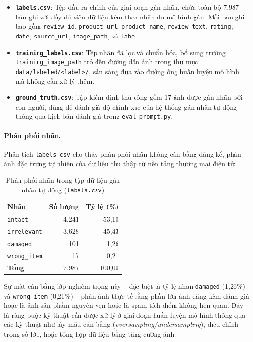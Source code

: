 \begin{itemize}
    \item \textbf{\texttt{labels.csv}}: Tệp đầu ra chính của giai đoạn gán nhãn, chứa
    toàn bộ 7.987 bản ghi với đầy đủ siêu dữ liệu kèm theo nhãn do mô hình gán. Mỗi
    bản ghi bao gồm \texttt{review\_id}, \texttt{product\_url}, \texttt{product\_name},
    \texttt{review\_text}, \texttt{rating}, \texttt{date}, \texttt{source\_url},
    \texttt{image\_path}, và \texttt{label}.

    \item \textbf{\texttt{training\_labels.csv}}: Tệp nhãn đã lọc và chuẩn hóa, bổ
    sung trường \texttt{training\_image\_path} trỏ đến đường dẫn ảnh trong thư mục
    \texttt{data/labeled/<label>/}, sẵn sàng đưa vào đường ống huấn luyện mô hình mà
    không cần xử lý thêm.

    \item \textbf{\texttt{ground\_truth.csv}}: Tập kiểm định thủ công gồm 17 ảnh được
    gán nhãn bởi con người, dùng để đánh giá độ chính xác của hệ thống gán nhãn tự
    động thông qua kịch bản đánh giá trong \texttt{eval\_prompt.py}.
\end{itemize}

\paragraph{Phân phối nhãn.}
Phân tích \texttt{labels.csv} cho thấy phân phối nhãn không cân bằng đáng kể, phản
ánh đặc trưng tự nhiên của dữ liệu thu thập từ nền tảng thương mại điện tử:

\begin{table}[h]
\centering
\caption{Phân phối nhãn trong tập dữ liệu gán nhãn tự động (\texttt{labels.csv})}
\label{tab:label_distribution}
\begin{tabular}{lrr}
\hline
\textbf{Nhãn} & \textbf{Số lượng} & \textbf{Tỷ lệ (\%)} \\
\hline
\texttt{intact}     & 4.241 & 53,10 \\
\texttt{irrelevant} & 3.628 & 45,43 \\
\texttt{damaged}    &   101 &  1,26 \\
\texttt{wrong\_item}&    17 &  0,21 \\
\hline
\textbf{Tổng}       & 7.987 & 100,00 \\
\hline
\end{tabular}
\end{table}

Sự mất cân bằng lớp nghiêm trọng này -- đặc biệt là tỷ lệ nhãn \texttt{damaged}
(1,26\%) và \texttt{wrong\_item} (0,21\%) -- phản ánh thực tế rằng phần lớn ảnh đăng
kèm đánh giá hoặc là ảnh sản phẩm nguyên vẹn hoặc là spam tích điểm không liên
quan. Đây là ràng buộc kỹ thuật cần được xử lý ở giai đoạn huấn luyện mô hình thông
qua các kỹ thuật như lấy mẫu cân bằng (\textit{oversampling/undersampling}), điều
chỉnh trọng số lớp, hoặc tổng hợp dữ liệu bằng tăng
cường ảnh.

